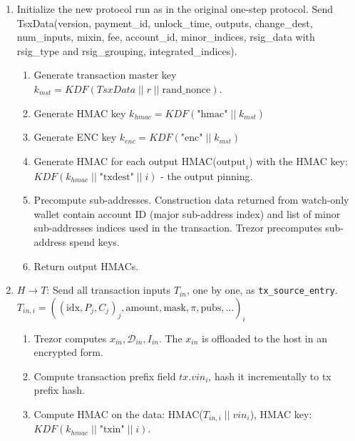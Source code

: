 \documentclass[]{article}
\begin{document}
\begin{enumerate}
	\item Initialize the new protocol run as in the original one-step protocol. Send TsxData(version, payment\_id, unlock\_time, outputs, change\_dest, num\_inputs, mixin, fee, account\_id, minor\_indices, rsig\_data with rsig\_type and rsig\_grouping, integrated\_indices).
	\begin{enumerate}
		\item Generate transaction master key $k_{mst} =  \textit{KDF}(TsxData \; || \; r \; || \; \text{rand\_nonce})$.
		
		\item Generate HMAC key $k_{hmac} = \textit{KDF}\left(\text{"hmac"} \; || \; k_{mst}\right)$
		
		\item Generate ENC key $k_{enc} = \textit{KDF}\left(\text{"enc"} \; || \; k_{mst}\right)$

		\item Generate HMAC for each output HMAC($\text{output}_i$) with the HMAC key: $\textit{KDF}(k_{hmac} \; || \; \text{"txdest"} \; || \; i)$ - the output pinning.
		
		\item Precompute sub-addresses. Construction data returned from watch-only wallet contain account ID (major sub-address index) and list of minor sub-addresses indices used in the transaction. Trezor precomputes sub-address spend keys.
		
		\item Return output HMACs.
	\end{enumerate} 

	\item $H \rightarrow T$: Send all transaction inputs $T_{in}$, one by one, as \verb|tx_source_entry|.\\
	$T_{in,i} = ((\text{idx}, P_j,C_j)_j, \text{amount}, \text{mask}, \pi, \text{pubs}, \dots)_i$
	\begin{enumerate}
		\item Trezor computes $x_{in}, \mathcal{D}_{in}, I_{in}$. The $x_{in}$ is offloaded to the host in an encrypted form.
		
		\item Compute transaction prefix field $tx.vin_i$, hash it incrementally to tx prefix hash.
		
		\item Compute HMAC on the data: HMAC($T_{in,i} \; || \; vin_i$), HMAC key: $\textit{KDF}(k_{hmac} \; || \; \text{"txin"} \; || \; i)$.
		

\end{enumerate}
\end{enumerate}
\end{document}

